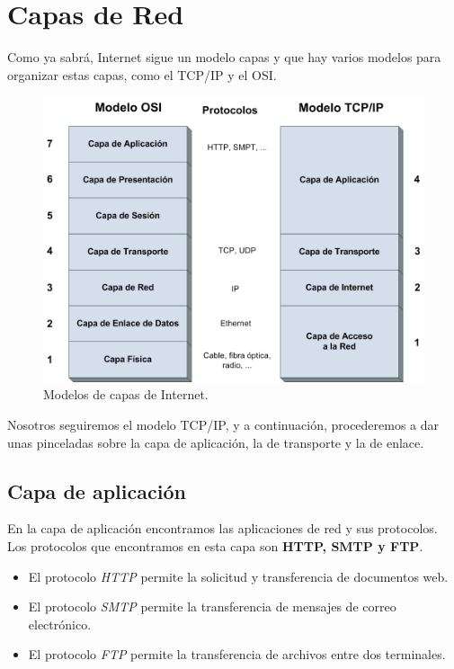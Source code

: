 \section{Capas de Red}

Como ya sabrá, Internet sigue un modelo capas y que hay varios modelos para 
organizar estas capas, como el TCP/IP y el OSI.

\begin{figure}[H]
  \includegraphics[width=1\textwidth]{imagenes/capas.png}
  \centering
  \caption{Modelos de capas de Internet.}
\end{figure}

Nosotros seguiremos el modelo TCP/IP, y a continuación, procederemos a dar 
unas pinceladas sobre la capa de aplicación, la de transporte y la de enlace.

\subsection{Capa de aplicación}

En la capa de aplicación encontramos las aplicaciones de red y sus protocolos. 
Los protocolos que encontramos en esta capa son \textbf{HTTP, SMTP y FTP}. 
\intro
\begin{itemize}
\item El protocolo \textit{HTTP} permite la solicitud y transferencia de documentos web.
\item El protocolo \textit{SMTP} permite la transferencia de mensajes de correo electrónico.
\item El protocolo \textit{FTP} permite la transferencia de archivos entre dos terminales.
\end{itemize}

